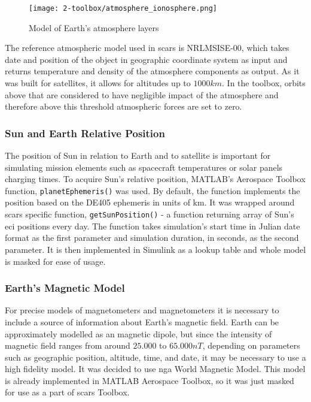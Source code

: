 
        \begin{figure}[H]
            \centering
            \texttt{[image: 2-toolbox/atmosphere\_ionosphere.png]}
            \caption{Model of Earth's atmosphere layers}
            \label{fig:atmosphere}
        \end{figure}

        The reference atmospheric model used in \ac{scars} is NRLMSISE-00, which takes date and position of the object in geographic coordinate system as input and returns temperature and density of the atmosphere components as output. As it was built for satellites, it allows for altitudes up to $1000km$. In the toolbox, orbits above that are considered to have negligible impact of the atmosphere and therefore above this threshold atmospheric forces are set to zero.

    \subsubsection{Sun and Earth Relative Position}
        The position of Sun in relation to Earth and to satellite is important for simulating mission elements such as spacecraft temperatures or solar panels charging times. To acquire Sun's relative position, MATLAB's Aerospace Toolbox function, \verb|planetEphemeris()| was used. By default, the function implements the position based on the DE405 ephemeris in units of km. It was wrapped around \ac{scars} specific function, \verb|getSunPosition()| - a function returning array of Sun's \ac{eci} positions every day. The function takes simulation's start time in Julian date format as the first parameter and simulation duration, in seconds, as the second parameter. It is then implemented in Simulink as a lookup table and whole model is masked for ease of usage.

    \subsubsection{Earth's Magnetic Model}
        For precise models of magnetometers and magnetometers it is necessary to include a source of information about Earth's magnetic field. Earth can be approximately modelled as an magnetic dipole, but since the intensity of magnetic field ranges from around $25.000$ to $65.000 nT$, depending on parameters such as geographic position, altitude, time, and date, it may be necessary to use a high fidelity model. It was decided to use \ac{nga} World Magnetic Model. This model is already implemented in MATLAB Aerospace Toolbox, so it was just masked for use as a part of \ac{scars} Toolbox.
 